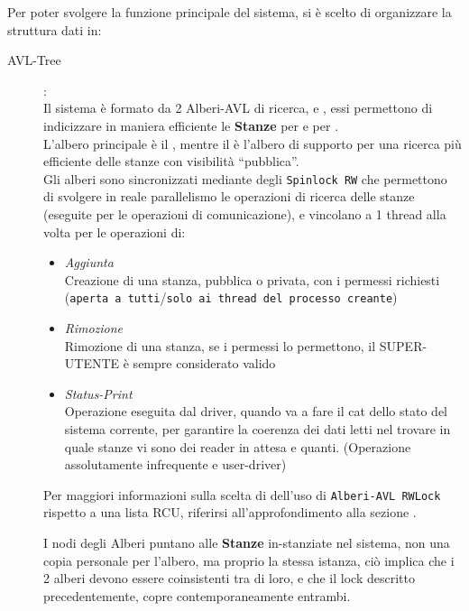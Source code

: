 Per poter svolgere la funzione principale del sistema, si è scelto di organizzare la struttura dati in:
\begin{description}
\item[AVL-Tree]:\\
    Il sistema è formato da  2 Alberi-AVL di ricerca, \tagTree e \keyTree, essi permettono di indicizzare in
    maniera efficiente le \textbf{Stanze} per \tagSys e per \keySys. \\
    L'albero principale è il \tagTree, mentre il \keyTree è l'albero di supporto per una ricerca più efficiente delle
    stanze con visibilità ``pubblica''.\\
    Gli alberi sono sincronizzati mediante degli \texttt{Spinlock RW} che permettono di svolgere in reale parallelismo
    le operazioni di ricerca delle stanze (eseguite per le operazioni di comunicazione), e vincolano a 1 thread alla
    volta per le operazioni di:
    \begin{itemize}
    \item \textit{Aggiunta} \\
        Creazione di una stanza, pubblica o privata, con i permessi richiesti\\
        (\texttt{aperta a tutti}/\texttt{solo ai thread del processo creante})
    \item \textit{Rimozione} \\
        Rimozione di una stanza, se i permessi lo permettono, il SUPER-UTENTE è sempre considerato valido
    \item \textit{Status-Print} \\
        Operazione eseguita dal driver, quando va a fare il cat dello stato del sistema corrente, per garantire la
        coerenza dei dati letti nel trovare in quale stanze vi sono dei reader in attesa e quanti. (Operazione
        assolutamente infrequente e user-driver)
\end{itemize}

    \begin{small}
    Per maggiori informazioni sulla scelta di dell'uso di \texttt{Alberi-AVL RWLock} rispetto a una lista
    RCU, riferirsi all'approfondimento alla sezione .
    \end{small}

    I nodi degli Alberi puntano alle \textbf{Stanze} in-stanziate nel sistema, non una copia personale per l'albero, ma
    proprio la stessa istanza, ciò implica che i 2 alberi devono essere coinsistenti tra di loro, e che il lock
    descritto precedentemente, copre contemporaneamente entrambi.


\end{description}
